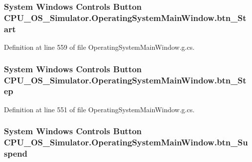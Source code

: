\subsubsection[{btn\+\_\+\+Start}]{\setlength{\rightskip}{0pt plus 5cm}System Windows Controls Button C\+P\+U\+\_\+\+O\+S\+\_\+\+Simulator.\+Operating\+System\+Main\+Window.\+btn\+\_\+\+Start\hspace{0.3cm}{\ttfamily [package]}}\label{class_c_p_u___o_s___simulator_1_1_operating_system_main_window_a811cecc7b1fa49c7f340be7377ff7f32}


Definition at line 559 of file Operating\+System\+Main\+Window.\+g.\+cs.

\hypertarget{class_c_p_u___o_s___simulator_1_1_operating_system_main_window_aa7fab2cb43aa4eefed8e3bcba47a539b}{}
\subsubsection[{btn\+\_\+\+Step}]{\setlength{\rightskip}{0pt plus 5cm}System Windows Controls Button C\+P\+U\+\_\+\+O\+S\+\_\+\+Simulator.\+Operating\+System\+Main\+Window.\+btn\+\_\+\+Step\hspace{0.3cm}{\ttfamily [package]}}\label{class_c_p_u___o_s___simulator_1_1_operating_system_main_window_aa7fab2cb43aa4eefed8e3bcba47a539b}


Definition at line 551 of file Operating\+System\+Main\+Window.\+g.\+cs.

\hypertarget{class_c_p_u___o_s___simulator_1_1_operating_system_main_window_abb2c3824f2ed103814e81c8a6bf5452e}{}
\subsubsection[{btn\+\_\+\+Suspend}]{\setlength{\rightskip}{0pt plus 5cm}System Windows Controls Button C\+P\+U\+\_\+\+O\+S\+\_\+\+Simulator.\+Operating\+System\+Main\+Window.\+btn\+\_\+\+Suspend\hspace{0.3cm}{\ttfamily [package]}}\label{class_c_p_u___o_s___simulator_1_1_operating_system_main_window_abb2c3824f2ed103814e81c8a6bf5452e}


